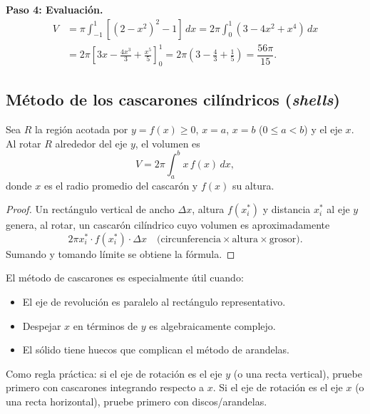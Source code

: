 \begin{example}
\begin{myproof}
\textbf{Paso 4: Evaluación.}
\begin{align*}
  V &= \pi\int_{-1}^{1}\left[(2-x^2)^2-1\right]\,dx
     = 2\pi\int_0^1(3-4x^2+x^4)\,dx \\
    &= 2\pi\left[3x-\frac{4x^3}{3}+\frac{x^5}{5}\right]_0^1
     = 2\pi\left(3-\frac{4}{3}+\frac{1}{5}\right)
     = \boxed{\dfrac{56\pi}{15}}.
\end{align*}
\end{myproof}
\end{example}

\subsection{Método de los cascarones cilíndricos (\emph{shells})}

\begin{theorem}
Sea $R$ la región acotada por $y=f(x)\geq 0$, $x=a$, $x=b$
($0\leq a<b$) y el eje $x$. Al rotar $R$ alrededor del eje $y$, el volumen
es
\[
  V = 2\pi\int_a^b x\,f(x)\,dx,
\]
donde $x$ es el radio promedio del cascarón y $f(x)$ su altura.
\end{theorem}

\begin{proof}
Un rectángulo vertical de ancho $\Delta x$, altura $f(x_i^*)$ y distancia
$x_i^*$ al eje $y$ genera, al rotar, un cascarón cilíndrico cuyo volumen
es aproximadamente
\[
  2\pi x_i^*\cdot f(x_i^*)\cdot\Delta x
  \quad\bigl(\text{circunferencia}\times\text{altura}\times\text{grosor}\bigr).
\]
Sumando y tomando límite se obtiene la fórmula.
\end{proof}

\begin{rem}
El método de cascarones es especialmente útil cuando:
\begin{itemize}
  \item El eje de revolución es paralelo al rectángulo representativo.
  \item Despejar $x$ en términos de $y$ es algebraicamente complejo.
  \item El sólido tiene huecos que complican el método de arandelas.
\end{itemize}
Como regla práctica: si el eje de rotación es el eje $y$ (o una recta
vertical), pruebe primero con cascarones integrando respecto a $x$.
Si el eje de rotación es el eje $x$ (o una recta horizontal), pruebe
primero con discos/arandelas.
\end{rem}

